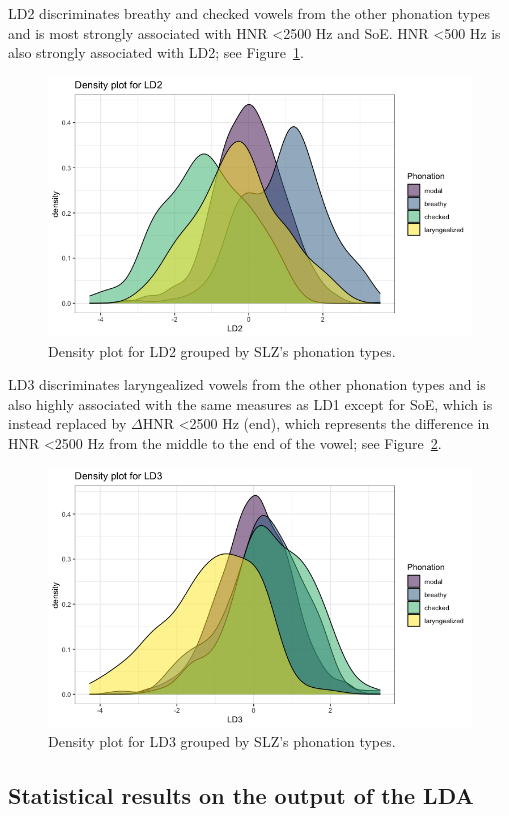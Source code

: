 \documentclass[12pt, letterpaper]{article}
\begin{document}
LD2 discriminates breathy and checked vowels from the other phonation types and is most strongly associated with HNR \textless 2500 Hz and SoE. HNR \textless 500 Hz is also strongly associated with LD2; see Figure~\ref*{fig:LD2}. 
\begin{figure}[!h]
    \centering
    \includegraphics[width=.75\linewidth]{Images/ld2_density.png}
    \caption{Density plot for LD2 grouped by SLZ's phonation types.}
    \label{fig:LD2}
\end{figure}

LD3 discriminates laryngealized vowels from the other phonation types and is also highly associated with the same measures as LD1 except for SoE, which is instead replaced by $\Delta$HNR \textless 2500 Hz (end), which represents the difference in HNR \textless 2500 Hz from the middle to the end of the vowel; see Figure~\ref*{fig:LD3}. 
\begin{figure}[!h]
    \centering
    \includegraphics[width=.75\linewidth]{Images/ld3_density.png}
    \caption{Density plot for LD3 grouped by SLZ's phonation types.}
    \label{fig:LD3}
\end{figure}


\subsection{Statistical results on the output of the LDA} \label{sec:Stats}
\end{document}
